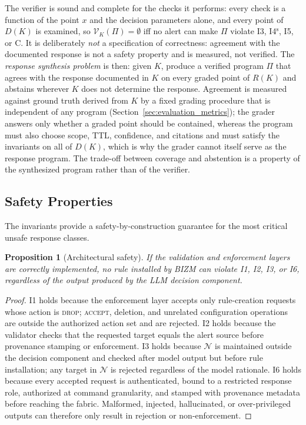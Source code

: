\documentclass[final,5p]{elsarticle}
\newtheorem{proposition}{Proposition}
\begin{document}
The verifier is sound and complete for the checks it performs: every check is a function of the point $x$ and the decision parameters alone, and every point of $D(K)$ is examined, so $\mathcal{V}_K(\Pi)=\emptyset$ iff no alert can make $\Pi$ violate I3, I4$^{\mathrm{s}}$, I5, or C. It is deliberately \emph{not} a specification of correctness: agreement with the documented response is not a safety property and is measured, not verified. The \emph{response synthesis problem} is then: given $K$, produce a verified program $\Pi$ that agrees with the response documented in $K$ on every graded point of $R(K)$ and abstains wherever $K$ does not determine the response. Agreement is measured against ground truth derived from $K$ by a fixed grading procedure that is independent of any program (Section~\ref{sec:evaluation_metrics}); the grader answers only whether a graded point should be contained, whereas the program must also choose scope, TTL, confidence, and citations and must satisfy the invariants on all of $D(K)$, which is why the grader cannot itself serve as the response program. The trade-off between coverage and abstention is a property of the synthesized program rather than of the verifier.

\subsection{Safety Properties}
\label{sec:safety_argument}

The invariants provide a safety-by-construction guarantee for the most critical unsafe response classes.

\begin{proposition}[Architectural safety]
\label{prop:arch}
If the validation and enforcement layers are correctly implemented, no rule installed by BIZM can violate I1, I2, I3, or I6, regardless of the output produced by the LLM decision component.
\end{proposition}

\begin{proof}
I1 holds because the enforcement layer accepts only rule-creation requests whose action is \textsc{drop}; \textsc{accept}, deletion, and unrelated configuration operations are outside the authorized action set and are rejected. I2 holds because the validator checks that the requested target equals the alert source before provenance stamping or enforcement. I3 holds because $\mathcal{N}$ is maintained outside the decision component and checked after model output but before rule installation; any target in $\mathcal{N}$ is rejected regardless of the model rationale. I6 holds because every accepted request is authenticated, bound to a restricted response role, authorized at command granularity, and stamped with provenance metadata before reaching the fabric. Malformed, injected, hallucinated, or over-privileged outputs can therefore only result in rejection or non-enforcement.
\end{proof}
\end{document}
